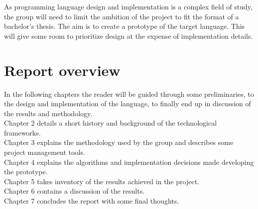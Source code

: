 As programming language design and implementation is a complex field of study, the group will need to limit the ambition of the project to fit the format of a bachelor's thesis. The aim is to create a prototype of the target language. This will give some room to prioritize design at the expense of implementation details.

\section{Report overview}

In the following chapters the reader will be guided through some preliminaries, to the design and implementation of the language, to finally end up in discussion of the results and methodology.\\[0.5cm]
Chapter 2 details a short history and background of the technological frameworks. \\
Chapter 3 explains the methodology used by the group and describes some project management tools. \\
Chapter 4 explains the algorithms and implementation decisions made developing the prototype. \\
Chapter 5 takes inventory of the results achieved in the project. \\
Chapter 6 contains a discussion of the results. \\
Chapter 7 concludes the report with some final thoughts.

